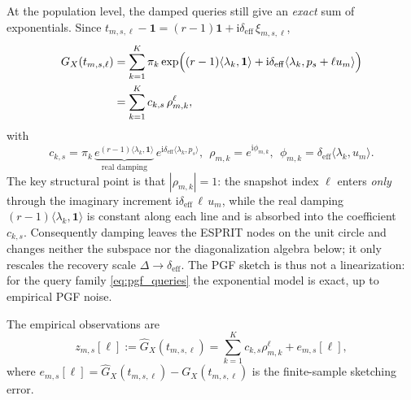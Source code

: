 \documentclass[sigconf,natbib=true,anonymous=true,review=true]{acmart}
\newcommand{\jj}{\mathrm{i}}
\newcommand{\deff}{\delta_{\mathrm{eff}}}
\begin{document}
At the population level, the damped queries still give an \emph{exact} sum of
exponentials. Since $t_{m,s,\ell}-\mathbf{1}=(r-1)\mathbf{1}+\jj\deff\,\xi_{m,s,\ell}$,
\begin{align}
    G_X(t_{m,s,\ell})
    &=
    \sum_{k=1}^K
    \pi_k
    \exp\!\Big(
        (r-1)\langle\lambda_k,\mathbf{1}\rangle
        +\jj\deff\langle \lambda_k,p_s+\ell u_m\rangle
    \Big)
    \notag\\
    &=
    \sum_{k=1}^K
    c_{k,s}\,\rho_{m,k}^{\ell},
    \label{eq:exact_harmonic_model}
\end{align}
with
\begin{equation}
    c_{k,s}
    =
    \pi_k\,
    \underbrace{e^{(r-1)\langle\lambda_k,\mathbf{1}\rangle}}_{\text{real damping}}
    \,e^{\jj\deff\langle \lambda_k,p_s\rangle},
    \ \
    \rho_{m,k}
    =
    e^{\jj\phi_{m,k}},
    \ \
    \phi_{m,k}
    =
    \deff\langle \lambda_k,u_m\rangle.
    \label{eq:coefficients_nodes}
\end{equation}
The key structural point is that $|\rho_{m,k}|=1$: the snapshot index $\ell$ enters
\emph{only} through the imaginary increment $\jj\deff\,\ell\,u_m$, while the real
damping $(r-1)\langle\lambda_k,\mathbf{1}\rangle$ is constant along each line and is
absorbed into the coefficient $c_{k,s}$. Consequently damping leaves the ESPRIT
nodes on the unit circle and changes neither the subspace nor the diagonalization
algebra below; it only rescales the recovery scale $\Delta\!\to\!\deff$. The PGF
sketch is thus not a linearization: for the query family \eqref{eq:pgf_queries} the
exponential model is exact, up to empirical PGF noise.

The empirical observations are
\begin{equation}
    z_{m,s}[\ell]
    :=
    \widehat G_X(t_{m,s,\ell})
    =
    \sum_{k=1}^K
    c_{k,s}\rho_{m,k}^{\ell}
    +
    e_{m,s}[\ell],
    \label{eq:empirical_line_model}
\end{equation}
where $e_{m,s}[\ell]=\widehat G_X(t_{m,s,\ell})-G_X(t_{m,s,\ell})$ is the finite-sample sketching error.
\end{document}

